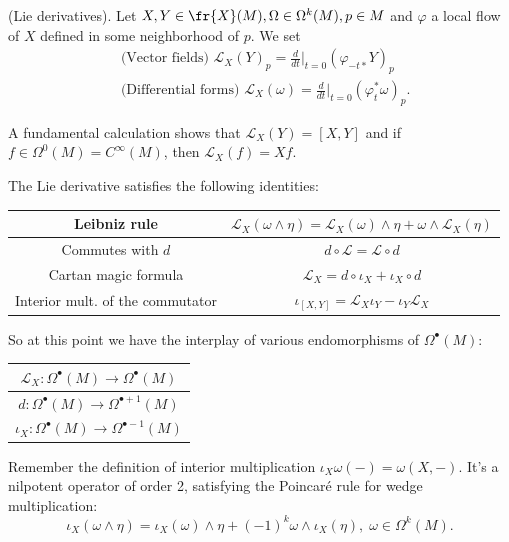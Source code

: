\begin{dang}
    \begin{definition}
        (Lie derivatives). Let $X,Y\in\fr{X}(M),\Omega\in\Omega^k(M),p\in M$ 
        and $\varphi$ a local flow of $X$ defined in some neighborhood of $p$. We set 
        \begin{equation}
            \begin{aligned}
                &\text{(Vector fields) }\mathcal{L}_X(Y)_p=\frac{d}{dt}\bigg|_{t=0}(\varphi_{-t*}Y)_p\\
                &\text{(Differential forms) }\mathcal{L}_X(\omega)=\frac{d}{dt}\bigg|_{t=0}(\varphi_t^*\omega)_p.
            \end{aligned}
        \end{equation}
    \end{definition}
\end{dang}
A fundamental calculation shows that $\mathcal{L}_X(Y)=[X,Y]$ and if $f\in\Omega^0(M)=C^\infty(M)$, then 
$\mathcal{L}_X(f)=Xf$.\par 

The Lie derivative satisfies the following identities:
\begin{center}
    \begin{tabular}{|c|c|}
        \hline 
        Leibniz rule & $\mathcal{L}_X(\omega\wedge\eta)=\mathcal{L}_X(\omega)\wedge\eta+\omega\wedge\mathcal{L}_X(\eta)$\\
        \hline 
        Commutes with $d$ & $d\circ\mathcal{L}=\mathcal{L}\circ d$\\
        \hline 
        Cartan magic formula & $\mathcal{L}_X=d\circ \iota_X+\iota_X \circ d$\\
        \hline 
        Interior mult. of the commutator & $\iota_{[X,Y]}=\mathcal{L}_X\iota_Y-\iota_Y\mathcal{L}_X$\\
        \hline
    \end{tabular}
\end{center}
So at this point we have the interplay of various endomorphisms of $\Omega^\bullet(M)$:
\begin{center}
    \begin{tabular}{|c|}
        \hline 
       $\mathcal{L}_X:\Omega^\bullet(M)\to\Omega^\bullet(M)$\\
        \hline 
       $d:\Omega^\bullet(M)\to\Omega^{\bullet+1}(M)$\\
        \hline 
       $\iota_X:\Omega^\bullet(M)\to\Omega^{\bullet-1}(M)$\\
       \hline 
    \end{tabular}
\end{center}
Remember the definition of interior multiplication $\iota_X\omega(-)=\omega(X,-)$. It's a nilpotent operator of order 2, 
satisfying the Poincaré rule for wedge multiplication:
\begin{equation}
    \iota_X(\omega\wedge\eta)=\iota_X(\omega)\wedge\eta+(-1)^{k}\omega\wedge\iota_X(\eta),\;\omega\in\Omega^k(M).
\end{equation}

